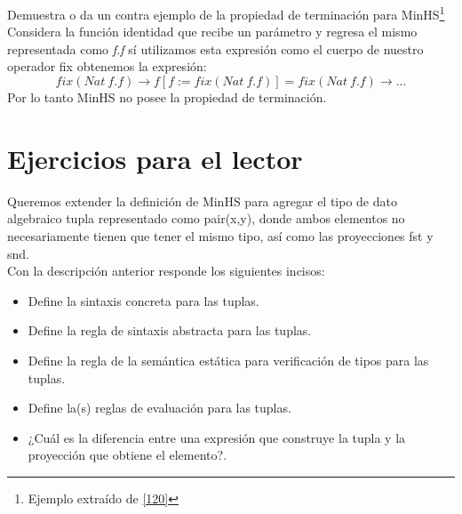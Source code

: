         \begin{exercise}
            Demuestra o da un contra ejemplo de la propiedad de terminación para \textsf{MinHS}\footnote{Ejemplo extraído de \hyperlink{120}{[120]}}\\

            Considera la función identidad que recibe un parámetro y regresa el mismo representada como \textit{f.f} sí utilizamos esta expresión como el cuerpo de nuestro operador \textsf{fix} obtenemos la expresión:
            \[
                \textit{fix}(Nat\ f.f) \to f[f:=fix(Nat\ f.f)] = fix(Nat\ f.f)  \to ...
            \]
            Por lo tanto \textsf{MinHS} no posee la propiedad de terminación.
        \end{exercise}


\section{Ejercicios para el lector}

    \begin{exercise}
        Queremos extender la definición de \textsf{MinHS} para agregar el tipo de dato algebraico tupla representado como \textsf{pair(x,y)}, donde ambos elementos no necesariamente tienen que tener el mismo tipo, así como las proyecciones \textsf{fst} y \textsf{snd}.\\

        Con  la descripción anterior responde los siguientes incisos:\\
        \begin{itemize}
            \item Define la sintaxis concreta para las tuplas.
            \item Define la regla de sintaxis abstracta para las tuplas.
            \item Define la regla de la semántica estática para verificación de tipos para las tuplas.
            \item Define la(s) reglas de evaluación para las tuplas.
            \item ¿Cuál es la diferencia entre una expresión que construye la tupla y la proyección que obtiene el elemento?.
        \end{itemize}
    \end{exercise}

\bigskip

